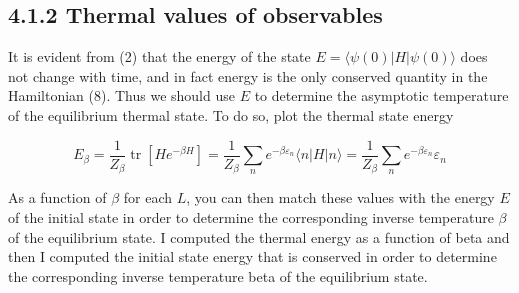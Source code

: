 \documentclass[12pt]{article}
\begin{document}
\subsection*{4.1.2 Thermal values of observables}
It is evident from (2) that the energy of the state $E=\langle\psi(0)|H| \psi(0)\rangle$ does not change with time, and in fact energy is the only conserved quantity in the Hamiltonian (8). Thus we should use $E$ to determine the asymptotic temperature of the equilibrium thermal state. To do so, plot the thermal state energy

\begin{equation*}
E_{\beta}=\frac{1}{Z_{\beta}} \operatorname{tr}\left[H e^{-\beta H}\right]=\frac{1}{Z_{\beta}} \sum_{n} e^{-\beta \varepsilon_{n}}\langle n|H| n\rangle=\frac{1}{Z_{\beta}} \sum_{n} e^{-\beta \varepsilon_{n}} \varepsilon_{n} \tag{10}
\end{equation*}

As a function of $\beta$ for each $L$, you can then match these values with the energy $E$ of the initial state in order to determine the corresponding inverse temperature $\beta$ of the equilibrium state.
\newpage
I computed the thermal energy as a function of beta and then I computed the initial state energy that is conserved in order to determine the corresponding inverse temperature beta of the equilibrium state.
\end{document}
